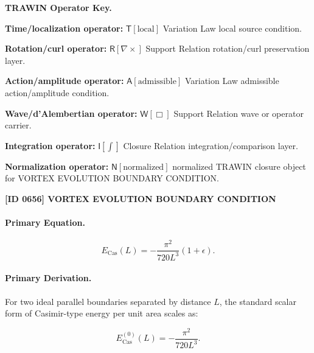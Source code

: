 \par\vspace{0.45\baselineskip}
\noindent\begin{minipage}[t]{\linewidth}
\begingroup
\small
\raggedright
\textbf{TRAWIN Operator Key.}\par
\noindent\textbf{Time/localization operator:} $\mathsf{T}\!\left[\mathrm{local}\right]$ Variation Law local source condition.\par
\noindent\textbf{Rotation/curl operator:} $\mathsf{R}\!\left[\nabla\times\right]$ Support Relation rotation/curl preservation layer.\par
\noindent\textbf{Action/amplitude operator:} $\mathsf{A}\!\left[\mathrm{admissible}\right]$ Variation Law admissible action/amplitude condition.\par
\noindent\textbf{Wave/d'Alembertian operator:} $\mathsf{W}\!\left[\Box\right]$ Support Relation wave or operator carrier.\par
\noindent\textbf{Integration operator:} $\mathsf{I}\!\left[\int\right]$ Closure Relation integration/comparison layer.\par
\noindent\textbf{Normalization operator:} $\mathsf{N}\!\left[\mathrm{normalized}\right]$ normalized TRAWIN closure object for VORTEX EVOLUTION BOUNDARY CONDITION.\par
\endgroup
\end{minipage}

\clearpage
\noindent\textbf{[ID 0656] VORTEX EVOLUTION BOUNDARY CONDITION}\par
\vspace{0.35em}
\paragraph{Primary Equation.}
\begin{equation}
E_{\mathrm{Cas}}(L)
=
-\frac{\pi^2}{720L^3}(1+\epsilon).
\end{equation}

\paragraph{Primary Derivation.}
For two ideal parallel boundaries separated by distance $L$, the standard scalar form of Casimir-type energy per unit area scales as:

\begin{equation}
E_{\mathrm{Cas}}^{(0)}(L)
=
-\frac{\pi^2}{720L^3}.
\end{equation}

